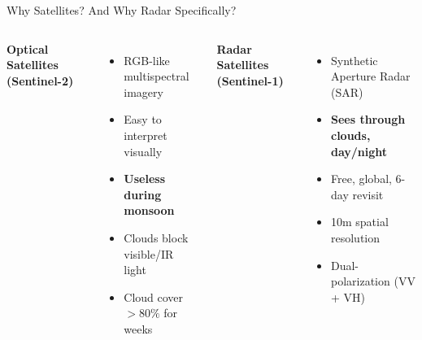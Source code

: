 \documentclass[10pt,aspectratio=169]{beamer}
\begin{document}
\begin{frame}{Why Satellites? And Why Radar Specifically?}
\begin{columns}[T,onlytextwidth]
\textbf{\textcolor{accentorange}{Optical Satellites (Sentinel-2)}}
\begin{itemize}
\item RGB-like multispectral imagery
\item Easy to interpret visually
\item \textbf{Useless during monsoon}
\item Clouds block visible/IR light
\item Cloud cover $>80\%$ for weeks
\end{itemize}

\textbf{\textcolor{softgreen}{Radar Satellites (Sentinel-1)}}
\begin{itemize}
\item Synthetic Aperture Radar (SAR)
\item \textbf{Sees through clouds, day/night}
\item Free, global, 6-day revisit
\item 10m spatial resolution
\item Dual-polarization (VV + VH)
\end{itemize}
\end{columns}

\vspace{0.8em}
\begin{center}
\end{center}
\end{frame}
\end{document}
